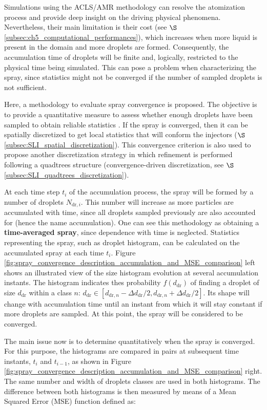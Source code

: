 Simulations using the ACLS/AMR methodology can resolve the atomization process and provide deep insight on the driving physical phenomena. Nevertheless, their main limitation is their cost (see $\S$\ref{subsec:ch5_computational_performances}), which increases when more liquid is present in the domain and more droplets are formed. Consequently, the accumulation time of droplets will be finite and, logically, restricted to the physical time being simulated. This can pose a problem when characterizing the spray, since statistics might not be converged if the number of sampled droplets is not sufficient.

Here, a methodology to evaluate spray convergence is proposed. The objective is to provide a quantitative measure to assess whether enough droplets have been sampled to obtain reliable statistics . If the spray is converged, then it can be spatially discretized to get local statistics that will conform the injectors ($\S$\ref{subsec:SLI_spatial_discretization}). This convergence criterion is also used to propose another discretization strategy in which refinement is performed following a quadtrees structure (convergence-driven discretization, see $\S$\ref{subsec:SLI_quadtrees_discretization}).

At each time step $t_i$ of the accumulation process, the spray will be formed by a number of droplets $N_{\mathrm{dr},i}$. This number will increase as more particles are accumulated with time, since all droplets sampled previously are also accounted for (hence the name accumulation). One can see this methodology as obtaining a \textbf{time-averaged spray}, since dependence with time is neglected. Statistics representing the spray, such as droplet histogram, can be calculated on the accumulated spray at each time $t_i$. Figure \ref{fig:spray_convergence_description_accumulation_and_MSE_comparison} left shows an illustrated view of the size histogram evolution at several accumulation instants. The histogram indicates thes probability $f \left( d_\mathrm{dr} \right)$ of finding a droplet of size $d_\mathrm{dr}$ within a class $n$: $d_\mathrm{dr} \in \left[ d_{\mathrm{dr},n}-\Delta d_\mathrm{dr}/2, d_{\mathrm{dr},n}+\Delta d_\mathrm{dr}/2 \right]$. Its shape will change with accumulation time until an instant from which it will stay constant if more droplets are sampled. At this point, the spray will be considered to be converged. 

The main issue now is to determine quantitatively when the spray is converged. For this purpose, the histograms are compared in pairs at subsequent time instants, $t_i$ and $t_{i-1}$, as shown in Figure \ref{fig:spray_convergence_description_accumulation_and_MSE_comparison} right. The same number and width of droplets classes are used in both histograms. The difference between both histograms is then measured by means of a Mean Squared Error (MSE) function defined as:

